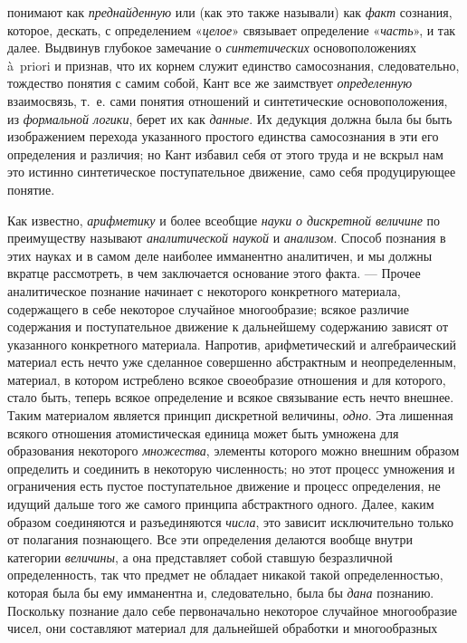 \documentclass[twoside]{article}
\begin{document}
{понимают как {\em преднайденную}
или (как это также называли) как
{\em факт} сознания,
которое, дескать, с определением
«{\em целое}» связывает
определение «{\em часть}»,
и так далее. Выдвинув глубокое замечание о
{\em синтетических}
основоположениях à~priori и признав, что их корнем служит
единство самосознания, следовательно, тождество понятия с самим собой, Кант
все же заимствует {\em определенную}
взаимосвязь, т.~е. сами понятия отношений и синтетические
основоположения, из {\em формальной
логики}, берет их как
{\em данные}. Их дедукция
должна была бы быть изображением перехода указанного простого единства
самосознания в эти его определения и различия; но Кант избавил себя от
этого труда и не вскрыл нам это истинно синтетическое поступательное
движение, само себя продуцирующее понятие.

Как известно,
{\em арифметику} и более
всеобщие {\em науки}
{\em о дискретной величине}
по преимуществу называют
{\em аналитической наукой}
и {\em анализом}.
Способ познания в этих науках и в самом деле наиболее
имманентно аналитичен, и мы должны вкратце рассмотреть, в чем заключается
основание этого факта. — Прочее аналитическое познание
начинает с некоторого конкретного материала, содержащего в себе некоторое
случайное многообразие; всякое различие содержания и поступательное
движение к дальнейшему содержанию зависят от указанного конкретного
материала. Напротив, арифметический и алгебраический материал есть нечто
уже сделанное совершенно абстрактным и неопределенным, материал, в котором
истреблено всякое своеобразие отношения и для которого, стало быть, теперь
всякое определение и всякое связывание есть нечто внешнее. Таким
материалом является принцип дискретной величины,
{\em одно}. Эта лишенная
всякого отношения атомистическая единица может быть умножена для
образования некоторого {\em множества},
элементы которого можно внешним образом определить и
соединить в некоторую численность; но этот процесс умножения и ограничения
есть пустое поступательное движение и процесс определения, не идущий дальше
того же самого принципа абстрактного одного. Далее, каким образом
соединяются и разъединяются
{\em числа}, это зависит
исключительно только от полагания познающего. Все эти определения делаются
вообще внутри категории {\em величины},
а она представляет собой ставшую безразличной определенность,
так что предмет не обладает никакой такой определенностью, которая была бы
ему имманентна и, следовательно, была бы
{\em дана} познанию.
Поскольку познание дало себе первоначально некоторое случайное многообразие
чисел, они составляют материал для дальнейшей обработки и многообразных
}
\end{document}
